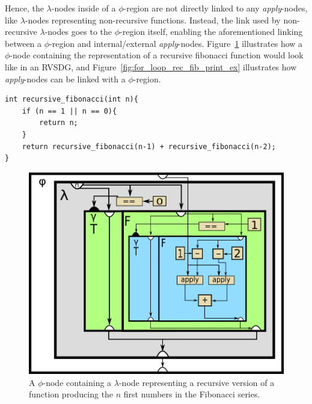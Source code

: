 \begin{itemize}
Hence, the $\lambda$-nodes inside of a $\phi$-region are not directly linked to
any \textit{apply}-nodes, like $\lambda$-nodes representing non-recursive
functions. Instead, the link used by non-recursive $\lambda$-nodes goes to the
$\phi$-region itself, enabling the aforementioned linking between a
$\phi$-region and internal/external \textit{apply}-nodes.
Figure~\ref{fig:rec_fib_phi} illustrates how a $\phi$-node containing the
representation of a recursive fibonacci function would look like in an RVSDG,
and Figure~\ref{fig:for_loop_rec_fib_print_ex} illustrates how
\textit{apply}-nodes can be linked with a $\phi$-region.

\end{itemize}

\begin{lstlisting}[label={lst:rec_fib_phi}, style=global_customcpp,
caption={C/C++ code corresponding to the RVSDG subgraph in
Figure~\ref{fig:for_loop_rec_fib_print_ex}, which represents a simple recursive
fibonacci function.}]
int recursive_fibonacci(int n){
	if (n == 1 || n == 0){
		return n;
	}
	return recursive_fibonacci(n-1) + recursive_fibonacci(n-2);
}
\end{lstlisting}
\vspace{-4\parskip} %

\begin{figure}[h!]
	\centering
	\includegraphics[width=\textwidth]{figures/recursive_fibonacci}
	\caption{A $\phi$-node containing a $\lambda$-node representing a recursive
version of a function producing the $n$ first numbers in the Fibonacci series.}
	\label{fig:rec_fib_phi}
\end{figure}

